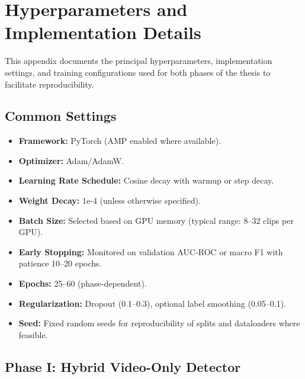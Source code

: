 \chapter{Hyperparameters and Implementation Details}
\label{app:hyperparams}

This appendix documents the principal hyperparameters, implementation settings, and training configurations used for both phases of the thesis to facilitate reproducibility.

\section{Common Settings}
\begin{itemize}
    \item \textbf{Framework:} PyTorch (AMP enabled where available).
    \item \textbf{Optimizer:} Adam/AdamW.
    \item \textbf{Learning Rate Schedule:} Cosine decay with warmup or step decay.
    \item \textbf{Weight Decay:} 1e-4 (unless otherwise specified).
    \item \textbf{Batch Size:} Selected based on GPU memory (typical range: 8--32 clips per GPU).
    \item \textbf{Early Stopping:} Monitored on validation AUC-ROC or macro F1 with patience 10--20 epochs.
    \item \textbf{Epochs:} 25--60 (phase-dependent).
    \item \textbf{Regularization:} Dropout (0.1--0.3), optional label smoothing (0.05--0.1).
    \item \textbf{Seed:} Fixed random seeds for reproducibility of splits and dataloaders where feasible.
\end{itemize}

\section{Phase I: Hybrid Video-Only Detector}
